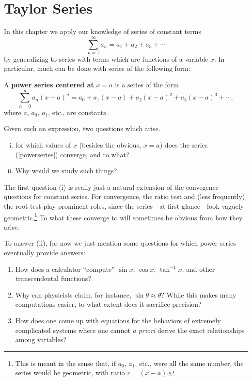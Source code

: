 \chapter{Taylor Series\label{TaylorSeriesChapter}}

In this chapter we apply  our knowledge of series of constant terms 
\begin{equation}\sum_{n=1}^\infty a_n
=a_1+a_2+a_3+\cdots\end{equation}
by generalizing to series   with terms which are  functions
of a variable $x$.  In particular, much can be done with series
of the following form:
\begin{definition}
A {\bf power series centered at} $x=a$ is a series of the form
\begin{equation}\sum_{n=0}^\infty a_n(x-a)^n
=a_0+a_1(x-a)+a_2(x-a)^2+a_3(x-a)^3+\cdots,\label{powerseries}\end{equation}
where $a$, $a_0$, $a_1$, etc., are constants.
\end{definition}
Given such an expression,
two  questions which  arise.
\begin{enumerate}[(i)]
\item for which values of $x$ (besides the obvious, $x=a$)
does the series (\ref{powerseries}) converge, and to what?
\item Why would we study such things?
\end{enumerate}
The first question (i) is really just a natural extension of 
the convegence questions for constant series.  For convergence, the
ratio test and (less frequently) the root test play prominent roles,
since the series---at first glance---look vaguely geometric.\footnote{%
This is meant in the sense that, 
if $a_0$, $a_1$, etc., were all the
same number, the series would be geometric, with ratio $r=(x-a)$.%
} 
To what these converge to will sometimes be obvious from how
they arise.

To answer (ii), for now we just mention some questions for which power series 
eventually provide  answers:
\begin{enumerate}
\item How does a calculator ``compute'' $\sin x$, $\cos x$, $\tan^{-1}x$,
and other transcendental functions?
\item Why can physicists claim, for instance, $\sin \theta\approx\theta$?  
While this makes many computations easier, to what extent does it sacrifice
precision?
\item How does one come up with equations for the behaviors of 
extremely complicated systems where  one cannot {\it a priori} derive the
exact relationships among variables?   
\end{enumerate}

